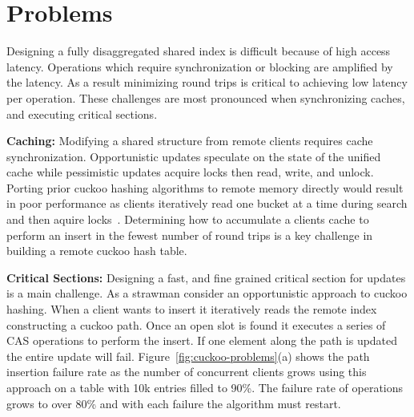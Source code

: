 \section{Problems}
\label{sec:problems}

Designing a fully disaggregated shared index is difficult
because of high access latency. Operations which require
synchronization or blocking are amplified by the latency. As
a result minimizing round trips is critical to achieving low
latency per operation. These challenges are most pronounced
when synchronizing caches, and executing critical sections.


\textbf{Caching:} Modifying a shared structure from remote
clients requires cache synchronization. Opportunistic
updates speculate on the state of the unified cache while
pessimistic updates acquire locks then read, write, and
unlock. Porting prior cuckoo hashing algorithms to remote
memory directly would result in poor performance as clients
iteratively read one bucket at a time during search and then
aquire locks~\cite{cuckoo-improvements, memc3, pilaf}.
Determining how to accumulate a clients cache to perform an
insert in the fewest number of round trips is a key
challenge in building a remote cuckoo hash table.



\textbf{Critical Sections:} Designing a fast, and fine
grained critical section for updates is a main challenge. As
a strawman consider an opportunistic approach to cuckoo
hashing. When a client wants to insert it iteratively reads
the remote index constructing a cuckoo path. Once an open
slot is found it executes a series of CAS operations to
perform the insert. If one element along the path is updated
the entire update will fail.
Figure~\ref{fig:cuckoo-problems}(a) shows the path insertion
failure rate as the number of concurrent clients grows using
this approach on a table with 10k entries filled to 90\%.
The failure rate of operations grows to over 80\% and with each
failure the algorithm must restart.

